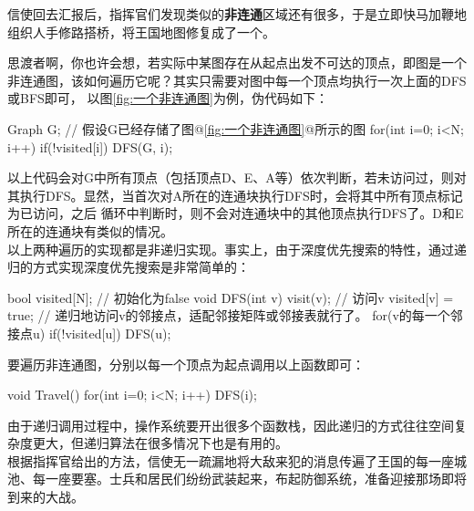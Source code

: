 信使回去汇报后，指挥官们发现类似的\textbf{非连通}区域还有很多，于是立即快马加鞭地组织人手修路搭桥，将王国地图修复成了一个。

思渡者啊，你也许会想，若实际中某图存在从起点出发不可达的顶点，即图是一个非连通图，该如何遍历它呢？其实只需要对图中每一个顶点均执行一次上面的DFS或BFS即可，
以图\ref{fig:一个非连通图}为例，伪代码如下：

\begin{cppcode}
    Graph G;    // 假设G已经存储了图@\ref{fig:一个非连通图}@所示的图
    for(int i=0; i<N; i++) {
        if(!visited[i]) {
            DFS(G, i);
        }
    }
\end{cppcode}
以上代码会对G中所有顶点（包括顶点D、E、A等）依次判断，若未访问过，则对其执行DFS。显然，当首次对A所在的连通块执行DFS时，会将其中所有顶点标记为已访问，之后
循环中判断时，则不会对连通块中的其他顶点执行DFS了。D和E所在的连通块有类似的情况。\\

以上两种遍历的实现都是非递归实现。事实上，由于深度优先搜索的特性，通过递归的方式实现深度优先搜索是非常简单的：
\begin{cppcode}
    bool visited[N];    // 初始化为false
    void DFS(int v) {
        visit(v);   // 访问v
        visited[v] = true;
        // 递归地访问v的邻接点，适配邻接矩阵或邻接表就行了。
        for(v的每一个邻接点u) { 
            if(!visited[u]) {
                DFS(u);
            }
        }
    }
\end{cppcode}
要遍历非连通图，分别以每一个顶点为起点调用以上函数即可：
\begin{cppcode}
    void Travel() {
        for(int i=0; i<N; i++) {
            DFS(i);
        }
    }
\end{cppcode}
由于递归调用过程中，操作系统要开出很多个函数栈，因此递归的方式往往空间复杂度更大，但递归算法在很多情况下也是有用的。\\


根据指挥官给出的方法，信使无一疏漏地将大敌来犯的消息传遍了王国的每一座城池、每一座要塞。士兵和居民们纷纷武装起来，布起防御系统，准备迎接那场即将到来的大战。


